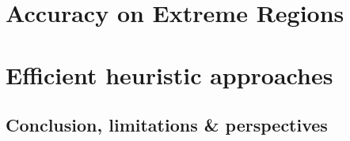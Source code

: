 \documentclass{ecsthesis}      %
\begin{document}
\part{Accuracy on Extreme Regions}\label{part:vect}




\part{Efficient heuristic approaches}
\label{part:heuristic}




\chapter{Conclusion, limitations \& perspectives}\label{chap:concl}


\appendix
%
%
\backmatter
{\small


}
% 
\end{document}
